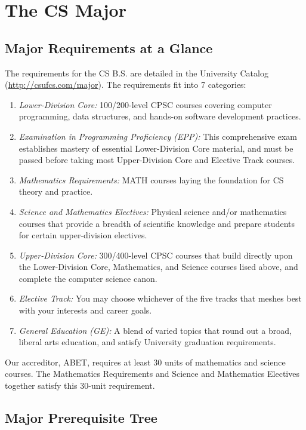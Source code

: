 \documentclass{book}
\newcommand{\shrunkurl}[1]{\url{http://csufcs.com/#1}}
\begin{document}
\chapter{The CS Major}

\section{Major Requirements at a Glance}

The requirements for the CS B.S. are detailed in the University
Catalog (\shrunkurl{major}). The requirements fit into 7 categories:
\begin{enumerate}
\item \emph{Lower-Division Core:} 100/200-level CPSC courses covering
  computer programming, data structures, and hands-on software
  development practices.
\item \emph{Examination in Programming Proficiency (EPP):} This
  comprehensive exam establishes mastery of essential Lower-Division
  Core material, and must be passed before taking most Upper-Division
  Core and Elective Track courses.
\item \emph{Mathematics Requirements:} MATH courses laying the
  foundation for CS theory and practice.
\item \emph{Science and Mathematics Electives:} Physical science
  and/or mathematics courses that provide a breadth of scientific
  knowledge and prepare students for certain upper-division electives.
\item \emph{Upper-Division Core:} 300/400-level CPSC courses that
  build directly upon the Lower-Division Core, Mathematics, and
  Science courses lised above, and complete the computer science
  canon.
\item \emph{Elective Track:} You may choose whichever of the five
  tracks that meshes best with your interests and career goals.
\item \emph{General Education (GE):} A blend of varied topics that
  round out a broad, liberal arts education, and satisfy University
  graduation requirements.
\end{enumerate}
  
Our accreditor, ABET, requires at least 30 units of
mathematics and science courses. The Mathematics Requirements and
Science and Mathematics Electives together satisfy this 30-unit
requirement.

\section{Major Prerequisite Tree}
\label{section:major_prerequisite_tree}
\end{document}

